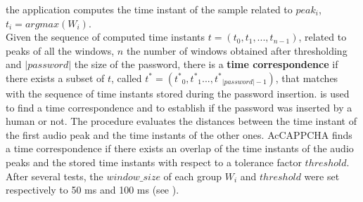 the application computes the time instant of the sample related to $peak_i$, $t_i= argmax(W_i)$.\\
Given the sequence of computed time instants $t=(t_0, t_1, ..., t_{n-1})$, related to peaks of all the windows, $n$ the number of windows obtained after thresholding and $|password|$ the size of the password, there is a \textbf{time correspondence} if there exists a subset of $t$, called $t^{*}=({t^*}_0, {t^*}_1..., {t^*}_{|password|-1})$, that matches with the sequence of time instants stored during the password insertion.  is used to find a time correspondence and to establish if the password was inserted by a human or not. The procedure evaluates the distances between the time instant of the first audio peak and the time instants of the other ones. AcCAPPCHA finds a time correspondence if there exists an overlap of the time instants of the audio peaks and the stored time instants with respect to a tolerance factor $threshold$. After several tests, the $window\_size$ of each group $W_i$ and $threshold$ were set respectively to 50 ms and 100 ms (see ).\\ 
